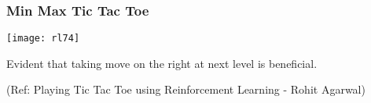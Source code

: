 \begin{frame}[fragile]\frametitle{Min Max Tic Tac Toe}



\begin{center}
\texttt{[image: rl74]}
\end{center}

Evident that taking move on the right at next level is beneficial.

{\tiny (Ref: Playing Tic Tac Toe using Reinforcement Learning - Rohit Agarwal)}

\end{frame}










